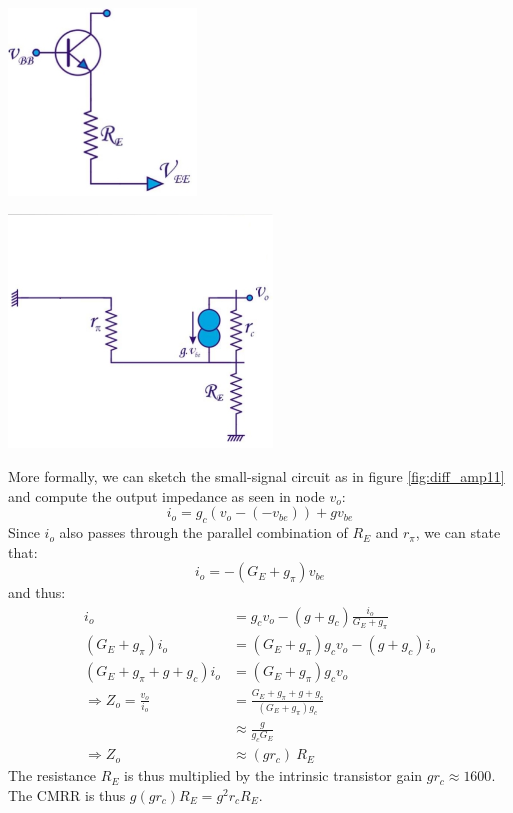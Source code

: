 \begin{minipage}{.4\textwidth}
	\centering
	\includegraphics[width=5cm]{figures/ch02/diff_amp10.jpg}
	\label{fig:diff_amp10}
\end{minipage}%
\begin{minipage}{.5\textwidth}
	\centering
	\includegraphics[width=7cm]{figures/ch02/diff_amp11.jpg}
	\label{fig:diff_amp11}
\end{minipage}

More formally, we can sketch the small-signal circuit as in figure \ref{fig:diff_amp11} and compute the output impedance as seen in  node $v_o$:
$$
	i_o = g_c (v_o - (-v_{be})) + g v_{be}
$$
Since $i_o$ also passes through the parallel combination of $R_E$ and $r_{\pi}$, we can state that:
$$i_o = -(G_E + g_{\pi}) v_{be}$$
and thus:
\begin{equation}
	\begin{split}
		i_o &= g_c v_o - (g + g_c) \frac{i_o} {G_E + g_{\pi}} \\
		(G_E + g_{\pi}) i_o &= (G_E + g_{\pi}) g_c v_o - (g + g_c) i_o \\
		(G_E + g_{\pi} + g + g_c) i_o &= (G_E + g_{\pi}) g_c v_o\\
		\Rightarrow Z_o = \frac{v_o}{i_o} &= \frac{G_E + g_{\pi} + g + g_c}{(G_E + g_{\pi}) g_c} \\
										   &\approx \frac{g}{g_c G_E} \\
		\Rightarrow Z_o &\approx (g r_c) \ R_E
	\end{split}
\end{equation}
The resistance $R_E$ is thus multiplied by the intrinsic transistor gain $gr_c \approx 1600$. The CMRR is thus $g (g r_c) R_E = g^2 r_c R_E$.

